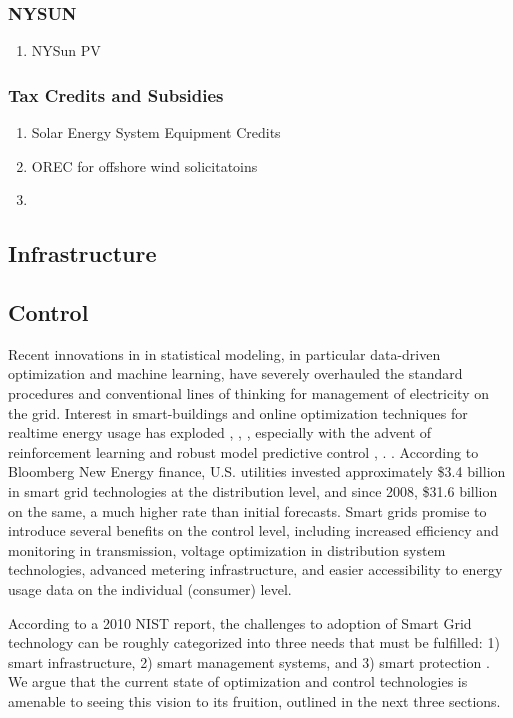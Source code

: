 \documentclass[plain]{article}
\newcommand{\1}{\mathbbm{1}}
\begin{document}
\subsubsection{NYSUN}
\begin{enumerate}
	\item NYSun PV
\end{enumerate}
\subsubsection{Tax Credits and Subsidies}
\begin{enumerate}
	\item Solar Energy System Equipment Credits
	\item OREC for offshore wind solicitatoins
	\item 
\end{enumerate}

\subsection{Infrastructure}

\subsection{Control}
Recent innovations in in statistical modeling, in particular data-driven optimization and machine learning, have severely overhauled the standard procedures and conventional lines of thinking for management of electricity on the grid. Interest in smart-buildings and online optimization techniques for realtime energy usage has exploded \cite{yu_review_2021}, \cite{khan_modeling_2022}, \cite{sembroiz_planning_2019}, especially with the advent of reinforcement learning and robust model predictive control \cite{chen_efficient_2020}, \cite{yang_adaptive_2019}. . According to Bloomberg New Energy finance, U.S. utilities invested approximately  \$3.4 billion in smart grid technologies at the distribution level, and since 2008, \$31.6 billion on the same, a much higher rate than initial forecasts. Smart grids promise to introduce several benefits on the control level, including increased efficiency and monitoring in transmission, voltage optimization in distribution system technologies, advanced metering infrastructure, and easier accessibility to energy usage data on the individual (consumer) level. \cite{cite energy.gov}


According to a 2010 NIST report, the challenges to adoption of Smart Grid technology can be roughly categorized into three needs that must be fulfilled: 1) smart infrastructure, 2) smart management systems, and 3) smart protection \cite{moreno_escobar_comprehensive_2021-1}. We argue that the current state of optimization and control technologies is amenable to seeing this vision to its fruition, outlined in the next three sections.
\end{document}
